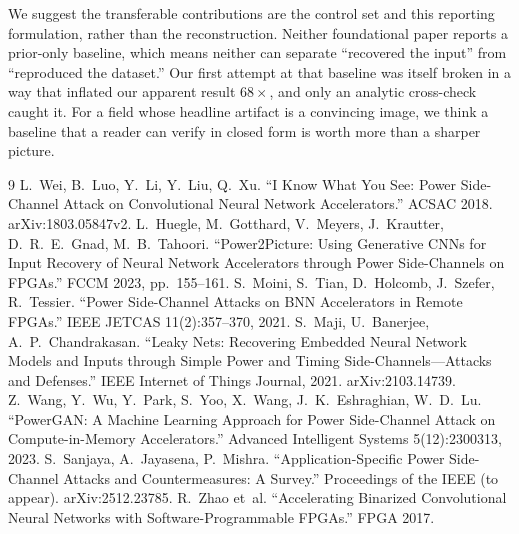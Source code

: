 \documentclass[10pt,conference]{article}
\begin{document}
We suggest the transferable contributions are the control set and this reporting
formulation, rather than the reconstruction. Neither foundational paper reports a prior-only baseline, which means
neither can separate ``recovered the input'' from ``reproduced the dataset.'' Our first
attempt at that baseline was itself broken in a way that inflated our apparent result
$68\times$, and only an analytic cross-check caught it. For a field whose headline
artifact is a convincing image, we think a baseline that a reader can verify in closed
form is worth more than a sharper picture.

\begin{thebibliography}{9}
 L.~Wei, B.~Luo, Y.~Li, Y.~Liu, Q.~Xu. ``I Know What You See: Power
Side-Channel Attack on Convolutional Neural Network Accelerators.'' ACSAC 2018.
arXiv:1803.05847v2.
 L.~Huegle, M.~Gotthard, V.~Meyers, J.~Krautter, D.~R.~E.~Gnad,
M.~B.~Tahoori. ``Power2Picture: Using Generative CNNs for Input Recovery of Neural
Network Accelerators through Power Side-Channels on FPGAs.'' FCCM 2023, pp.~155--161.
 S.~Moini, S.~Tian, D.~Holcomb, J.~Szefer, R.~Tessier. ``Power
Side-Channel Attacks on BNN Accelerators in Remote FPGAs.'' IEEE JETCAS 11(2):357--370,
2021.
 S.~Maji, U.~Banerjee, A.~P.~Chandrakasan. ``Leaky Nets: Recovering
Embedded Neural Network Models and Inputs through Simple Power and Timing
Side-Channels---Attacks and Defenses.'' IEEE Internet of Things Journal, 2021.
arXiv:2103.14739.
 Z.~Wang, Y.~Wu, Y.~Park, S.~Yoo, X.~Wang, J.~K.~Eshraghian, W.~D.~Lu.
``PowerGAN: A Machine Learning Approach for Power Side-Channel Attack on Compute-in-Memory
Accelerators.'' Advanced Intelligent Systems 5(12):2300313, 2023.
 S.~Sanjaya, A.~Jayasena, P.~Mishra. ``Application-Specific Power
Side-Channel Attacks and Countermeasures: A Survey.'' Proceedings of the IEEE (to appear).
arXiv:2512.23785.
 R.~Zhao et~al. ``Accelerating Binarized Convolutional Neural Networks
with Software-Programmable FPGAs.'' FPGA 2017.
\end{thebibliography}
\end{document}
